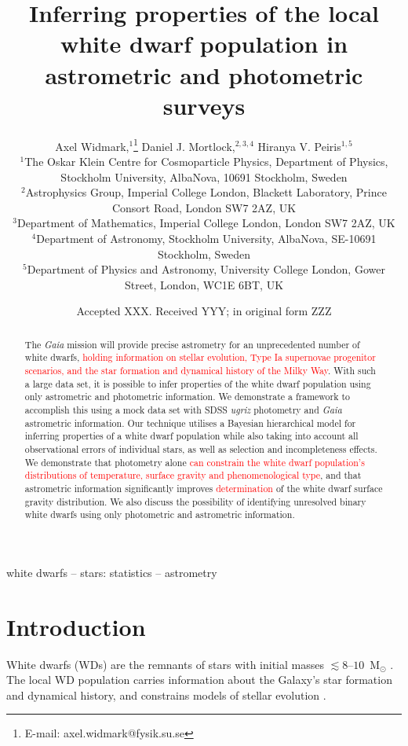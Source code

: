 \documentclass[fleqn,usenatbib]{mnras}
\title[Inferring properties of the white dwarf population]{Inferring properties of the local white dwarf population in astrometric and photometric surveys}
\author[A. Widmark et al.]{
Axel Widmark,$^1$\thanks{E-mail: axel.widmark@fysik.su.se} 
Daniel J. Mortlock,$^{2,3,4}$
Hiranya V. Peiris$^{1,5}$
\\
$^1$The Oskar Klein Centre for Cosmoparticle Physics, Department of
Physics, Stockholm University, AlbaNova, 10691 Stockholm, Sweden\\
$^2$Astrophysics Group, Imperial College London, Blackett Laboratory, Prince Consort Road, London SW7 2AZ, UK\\
$^3$Department of Mathematics, Imperial College London, London SW7 2AZ, UK\\
$^4$Department of Astronomy, Stockholm University, AlbaNova, SE-10691 Stockholm, Sweden\\
$^5$Department of Physics and Astronomy, University College London, Gower Street, London, WC1E 6BT, UK\\
}
\date{Accepted XXX. Received YYY; in original form ZZZ}
\newcommand{\changes}[1]{\textcolor{red}{#1}}
\begin{document}
\label{firstpage}
\pagerange{\pageref{firstpage}--\pageref{lastpage}}
\maketitle

\begin{abstract}
The \emph{Gaia} mission will provide precise astrometry for an unprecedented number of white dwarfs, \changes{holding information on stellar evolution, Type Ia supernovae progenitor scenarios, and the star formation and dynamical history of the Milky Way}. With such a large data set, it is possible to infer properties of the white dwarf population using only astrometric and photometric information. We demonstrate a framework to accomplish this using a mock data set with SDSS \emph{ugriz} photometry and \emph{Gaia} astrometric information.
Our technique utilises a Bayesian hierarchical model for inferring properties of a white dwarf population while also taking into account all observational errors of individual stars, as well as selection and incompleteness effects.
We demonstrate that photometry alone \changes{can constrain the white dwarf population's  distributions of temperature, surface gravity and phenomenological type}, and that astrometric information significantly improves \changes{determination} of the white dwarf surface gravity distribution. We also discuss the possibility of identifying unresolved binary white dwarfs using only photometric and astrometric information.
\end{abstract}

\begin{keywords}
white dwarfs -- stars: statistics -- astrometry
\end{keywords}









\section{Introduction}

White dwarfs (WDs) are the remnants of stars with initial masses $\lesssim8\mbox{--}10$~M$_\odot$ \citep{1996ApJ...460..489R,2009MNRAS.395.1409S}. The local WD population carries information about the Galaxy's star formation and dynamical history, and constrains models of stellar evolution \citep{1987ApJ...315L..77W,2016NewAR..72....1G,2018arXiv180505849E}.
\end{document}
